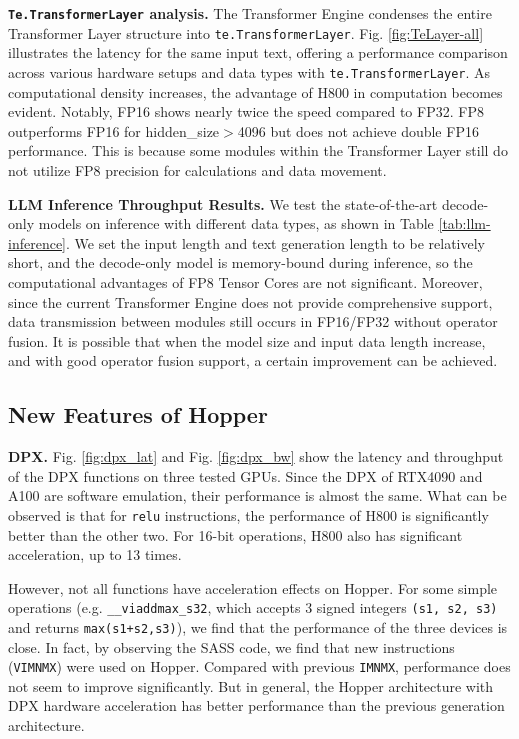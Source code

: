 \textbf{\texttt{Te.TransformerLayer} analysis.} The Transformer Engine condenses the entire Transformer Layer structure into \texttt{te.TransformerLayer}. Fig. \ref{fig:TeLayer-all} illustrates the latency for the same input text, offering a performance comparison across various hardware setups and data types with \texttt{te.TransformerLayer}. As computational density increases, the advantage of H800 in computation becomes evident. Notably, FP16 shows nearly twice the speed compared to FP32. FP8 outperforms FP16 for hidden\_size$>$4096 but does not achieve double FP16 performance. This is because some modules within the Transformer Layer still do not utilize FP8 precision for calculations and data movement.

\textbf{LLM Inference Throughput Results.} We test the state-of-the-art decode-only models on inference with different data types, as shown in Table \ref{tab:llm-inference}. We set the input length and text generation length to be relatively short, and the decode-only model is memory-bound during inference, so the computational advantages of FP8 Tensor Cores are not significant. Moreover, since the current Transformer Engine does not provide comprehensive support, data transmission between modules still occurs in FP16/FP32 without operator fusion. It is possible that when the model size and input data length increase, and with good operator fusion support, a certain improvement can be achieved.

\subsection{New Features of Hopper}
 \textbf{DPX.} Fig. \ref{fig:dpx_lat} and Fig. \ref{fig:dpx_bw} show the latency and throughput of the DPX functions on three tested GPUs. Since the DPX of RTX4090 and A100 are software emulation, their performance is almost the same. What can be observed is that for \texttt{relu} instructions, the performance of H800 is significantly better than the other two. For 16-bit operations, H800 also has significant acceleration, up to 13 times.

However, not all functions have acceleration effects on Hopper. For some simple operations (e.g. \texttt{\_\_viaddmax\_s32}, which accepts 3 signed integers \texttt{(s1, s2, s3)} and returns \texttt{max(s1+s2,s3)}), we find that the performance of the three devices is close. In fact, by observing the SASS code, we find that new instructions (\texttt{VIMNMX}) were used on Hopper. Compared with previous \texttt{IMNMX}, performance does not seem to improve significantly. But in general, the Hopper architecture with DPX hardware acceleration has better performance than the previous generation architecture.

